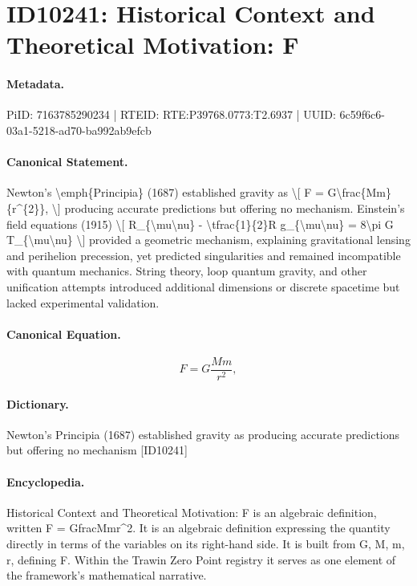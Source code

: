 \section*{ID10241: Historical Context and Theoretical Motivation: F}
\paragraph{Metadata.}
PiID: 7163785290234 | RTEID: RTE:P39768.0773:T2.6937 | UUID: 6c59f6c6-03a1-5218-ad70-ba992ab9efcb

\paragraph{Canonical Statement.}
Newton's \textbackslash{}emph\{Principia\} (1687) established gravity as \textbackslash{}[ F = G\textbackslash{}frac\{Mm\}\{r\textasciicircum{}\{2\}\}, \textbackslash{}] producing accurate predictions but offering no mechanism. Einstein's field equations (1915) \textbackslash{}[ R\_\{\textbackslash{}mu\textbackslash{}nu\} - \textbackslash{}tfrac\{1\}\{2\}R g\_\{\textbackslash{}mu\textbackslash{}nu\} = 8\textbackslash{}pi G T\_\{\textbackslash{}mu\textbackslash{}nu\} \textbackslash{}] provided a geometric mechanism, explaining gravitational lensing and perihelion precession, yet predicted singularities and remained incompatible with quantum mechanics. String theory, loop quantum gravity, and other unification attempts introduced additional dimensions or discrete spacetime but lacked experimental validation.

\paragraph{Canonical Equation.}
\[
F = G\frac{Mm}{r^{2}},
\]

\paragraph{Dictionary.}
Newton's Principia (1687) established gravity as producing accurate predictions but offering no mechanism [ID10241]

\paragraph{Encyclopedia.}
Historical Context and Theoretical Motivation: F is an algebraic definition, written F = GfracMmr\textasciicircum{}2. It is an algebraic definition expressing the quantity directly in terms of the variables on its right-hand side. It is built from G, M, m, r, defining F. Within the Trawin Zero Point registry it serves as one element of the framework's mathematical narrative.
